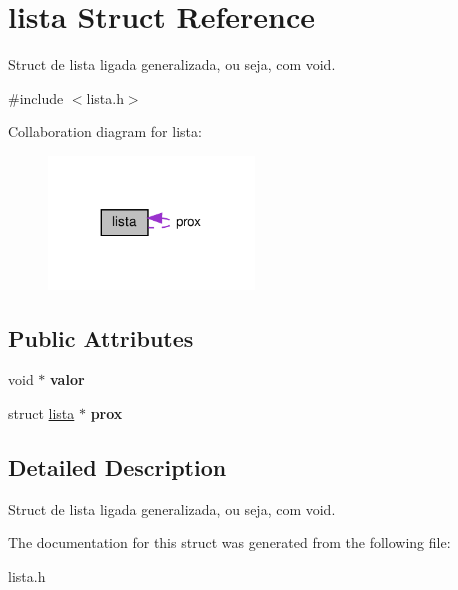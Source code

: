 \hypertarget{structlista}{}\section{lista Struct Reference}
\label{structlista}


Struct de lista ligada generalizada, ou seja, com void.  




{\ttfamily \#include $<$lista.\+h$>$}



Collaboration diagram for lista\+:\nopagebreak
\begin{figure}[H]
\begin{center}
\leavevmode
\includegraphics[width=155pt]{structlista__coll__graph}
\end{center}
\end{figure}
\subsection*{Public Attributes}
\begin{DoxyCompactItemize}
\item 
\mbox{\label{structlista_a1851230b0237deef0519ee33de9f2dd0}} 
void $\ast$ {\bfseries valor}
\item 
\mbox{\label{structlista_a3b0e375147c1163d74544fd206a1f1de}} 
struct \hyperlink{structlista}{lista} $\ast$ {\bfseries prox}
\end{DoxyCompactItemize}


\subsection{Detailed Description}
Struct de lista ligada generalizada, ou seja, com void. 

The documentation for this struct was generated from the following file\+:\begin{DoxyCompactItemize}
\item 
lista.\+h\end{DoxyCompactItemize}
